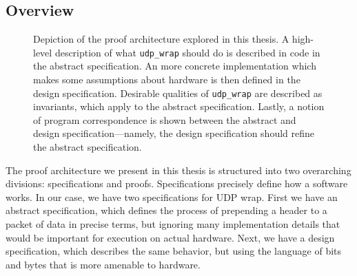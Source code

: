 \documentclass[twoside]{memoir}
\begin{document}
\subsection{Overview}
\begin{figure}[h]
    \centering
    \caption{Depiction of the proof architecture explored in this thesis.
    A high-level description of what \lstinline{udp_wrap} should do
    is described in code in the abstract specification.
    An more concrete implementation which makes some assumptions about hardware
    is then defined in the design specification.
    Desirable qualities of \lstinline{udp_wrap} are described as invariants,
    which apply to the abstract specification.
    Lastly, a notion of program correspondence is shown between the
    abstract and design specification---namely, the design specification
    should refine the abstract specification.
    }
    \label{fig:proof-structure-abstract-design}
\end{figure}
The proof architecture we present in this thesis is structured into 
two overarching divisions: specifications and proofs.
Specifications precisely define how a software works.
In our case, we have two specifications for UDP wrap.
First we have an abstract specification,
which defines the process of prepending a header to a packet of data
in precise terms, but ignoring many implementation details that would
be important for execution on actual hardware.
Next, we have a design specification,
which describes the same behavior, but using the language of bits and bytes
that is more amenable to hardware.
\end{document}
